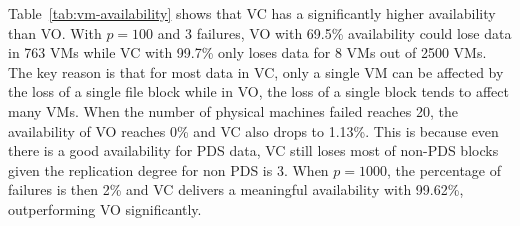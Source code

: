 

 Table~\ref{tab:vm-availability} shows 
that VC has a significantly  higher availability than VO.
With $p=100$ and 3 failures,
VO with 69.5\% availability could lose data in 763 VMs 
while VC with 99.7\% only loses data for 8 VMs out of 2500 VMs.
The key reason is that for most data in VC, only a single VM can be affected by
the loss of a single file block
while in VO, the loss of a
single block tends to affect many VMs.
When the number of physical machines failed reaches 20, the availability of VO reaches 0\%
and VC also drops to 1.13\%. This is because even there is a good availability for PDS data, VC still
loses most of non-PDS blocks given the replication degree for non PDS is 3.
When $p=1000$, the percentage of failures is then 2\% and VC delivers a meaningful availability 
with 99.62\%, outperforming VO significantly. 

